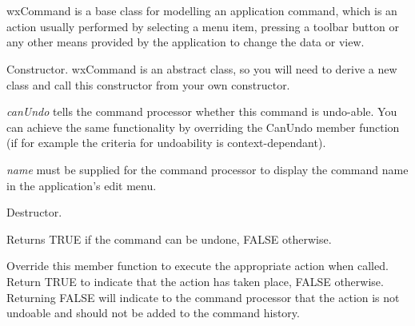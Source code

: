 \section{}\label{wxcommand}

wxCommand is a base class for modelling an application command,
which is an action usually performed by selecting a menu item, pressing
a toolbar button or any other means provided by the application to
change the data or view.








Constructor. wxCommand is an abstract class, so you will need to derive
a new class and call this constructor from your own constructor.

{\it canUndo} tells the command processor whether this command is undo-able. You
can achieve the same functionality by overriding the CanUndo member function (if for example
the criteria for undoability is context-dependant).

{\it name} must be supplied for the command processor to display the command name
in the application's edit menu.



Destructor.



Returns TRUE if the command can be undone, FALSE otherwise.



Override this member function to execute the appropriate action when called.
Return TRUE to indicate that the action has taken place, FALSE otherwise.
Returning FALSE will indicate to the command processor that the action is
not undoable and should not be added to the command history.

